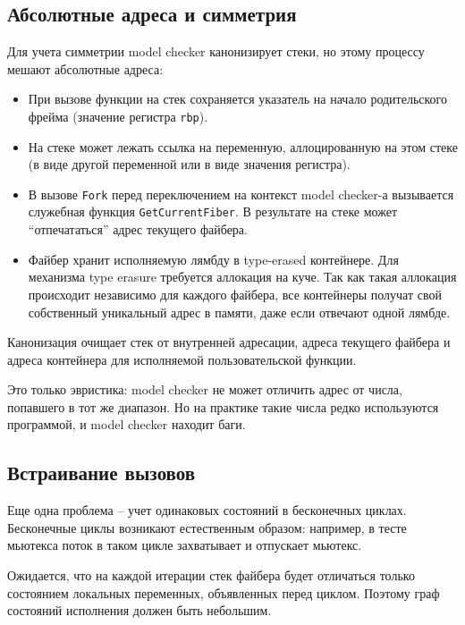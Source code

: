 \subsection{Абсолютные адреса и симметрия}

Для учета симметрии model checker канонизирует стеки, но этому процессу мешают абсолютные адреса:

\begin{itemize}
\item	При вызове функции на стек сохраняется указатель на начало родительского фрейма (значение регистра \texttt{rbp}).

\item	На стеке может лежать ссылка на переменную, аллоцированную на этом стеке (в виде другой переменной или в виде значения регистра).

\item	В вызове \texttt{Fork} перед переключением на контекст model checker-а вызывается служебная функция \texttt{GetCurrentFiber}. В результате на стеке может “отпечататься” адрес текущего файбера.

\item	Файбер хранит исполняемую лямбду в type-erased контейнере. Для механизма type erasure требуется аллокация на куче. Так как такая аллокация происходит независимо для каждого файбера, все контейнеры получат свой собственный уникальный адрес в памяти, даже если отвечают одной лямбде. 
\end{itemize}

Канонизация очищает стек от внутренней адресации, адреса текущего файбера и адреса контейнера для исполняемой пользовательской функции.

Это только эвристика: model checker не может отличить адрес от числа, попавшего в тот же диапазон. Но на практике такие числа редко используются программой, и model checker находит баги.

\subsection{Встраивание вызовов}

Еще одна проблема – учет одинаковых состояний в бесконечных циклах. Бесконечные циклы возникают естественным образом: например, в тесте мьютекса поток в таком цикле захватывает и отпускает мьютекс.

Ожидается, что на каждой итерации стек файбера будет отличаться только состоянием локальных переменных, объявленных перед циклом. Поэтому граф состояний исполнения должен быть небольшим. 


